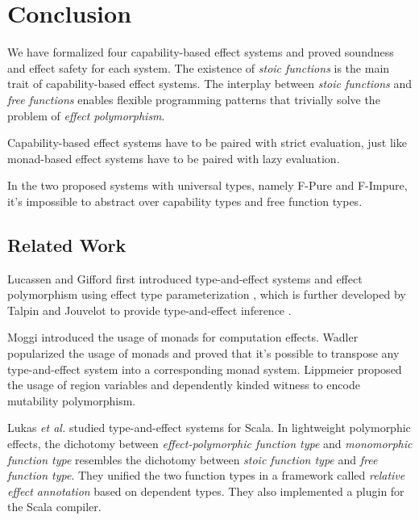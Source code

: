 \section{Conclusion}

We have formalized four capability-based effect systems and proved
soundness and effect safety for each system. The existence of
\emph{stoic functions} is the main trait of capability-based effect
systems. The interplay between \emph{stoic functions} and \emph{free
  functions} enables flexible programming patterns that trivially
solve the problem of \emph{effect polymorphism}.

Capability-based effect systems have to be paired with strict
evaluation, just like monad-based effect systems have to be paired
with lazy evaluation.

In the two proposed systems with universal types, namely F-Pure and
F-Impure, it's impossible to abstract over capability types and free
function types.

\subsection{Related Work}

Lucassen and Gifford first introduced type-and-effect
systems\cite{gifford1986integrating} and effect polymorphism using
effect type parameterization \cite{lucassen1988polymorphic}, which is
further developed by Talpin and Jouvelot to provide type-and-effect
inference \cite{talpin1992polymorphic, talpin1994type}.

Moggi introduced the usage of monads for computation
effects\cite{moggi1991notions}. Wadler popularized the usage of
monads\cite{wadler1992comprehending, wadler1995monads} and proved that
it's possible to transpose any type-and-effect system into a
corresponding monad system\cite{wadler2003marriage}. Lippmeier
proposed the usage of region variables and dependently kinded witness
to encode mutability polymorphism\cite{lippmeier2009witnessing}.

Lukas \emph{et al.}  studied type-and-effect systems for
Scala\cite{rytz2012lightweight, rytz2013flow, lukas2014effect}.  In
lightweight polymorphic effects\cite{rytz2012lightweight}, the
dichotomy between \emph{effect-polymorphic function type} and
\emph{monomorphic function type} resembles the dichotomy between
\emph{stoic function type} and \emph{free function type}.  They
unified the two function types in a framework called \emph{relative
  effect annotation} based on dependent types. They also implemented a
plugin for the Scala compiler.

